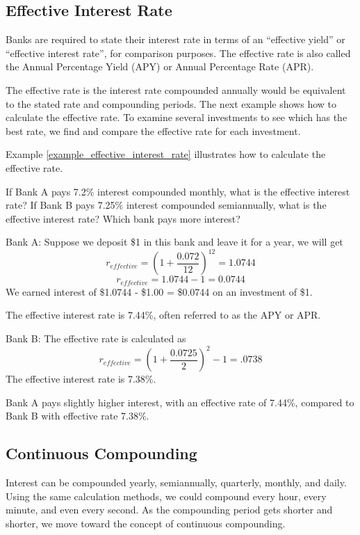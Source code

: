\subsection{Effective Interest Rate}
Banks are required to state their interest rate in terms of an “effective yield” or “effective interest rate”, for comparison purposes. The effective rate is also called the Annual Percentage Yield (APY) or Annual Percentage Rate (APR).

The effective rate is the interest rate compounded annually would be equivalent to the stated rate and compounding periods. The next example shows how to calculate the effective rate. To examine several investments to see which has the best rate, we find and compare the effective rate for each investment.

Example \ref{example_effective_interest_rate} illustrates how to calculate the effective rate.

\begin{example} \label{example_effective_interest_rate}
    If Bank A pays 7.2\% interest compounded monthly, what is the effective interest rate? If Bank B pays 7.25\% interest compounded semiannually, what is the effective interest rate? Which bank pays more interest?
\end{example}
\begin{solution}
    Bank A: Suppose we deposit \$1 in this bank and leave it for a year, we will get
    \[
        r_{effective} = \left(1 + \frac{0.072}{12}\right)^{12} = 1.0744
    \]
    \[
        r_{effective} = 1.0744 - 1 = 0.0744
    \]
    We earned interest of \$1.0744 - \$1.00 = \$0.0744 on an investment of \$1.

    The effective interest rate is 7.44\%, often referred to as the APY or APR.

    Bank B: The effective rate is calculated as
    \[
        r_{effective} = \left(1 + \frac{0.0725}{2}\right)^{2} - 1 = .0738
    \]
    The effective interest rate is 7.38\%.

    Bank A pays slightly higher interest, with an effective rate of 7.44\%, compared to Bank B with effective rate 7.38\%.
\end{solution}


\subsection{Continuous Compounding}\label{subsection_continuous_compounding}

Interest can be compounded yearly, semiannually, quarterly, monthly, and daily. Using the same calculation methods, we could compound every hour, every minute, and even every second. As the compounding period gets shorter and shorter, we move toward the concept of continuous compounding.

